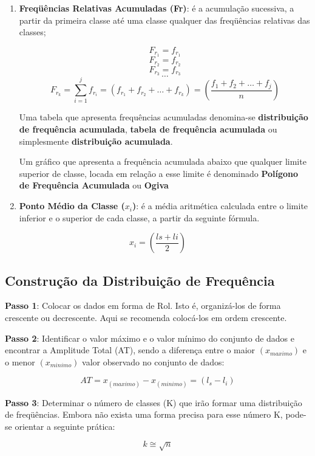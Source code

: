 \begin{enumerate}
\item \textbf{Freqüências Relativas Acumuladas (Fr)}: é a acumulação sucessiva, a partir da primeira classe até uma classe qualquer das freqüências relativas das classes;

    $$ F_{r_{1}}=f_{r_{1}} $$
    $$ F_{r_{2}}=f_{r_{2}} $$
    $$ F_{r_{3}}=f_{r_{3}} $$
    $$   \ldots  $$
    $$ F_{r_{k}}=  \sum_{i=1}^{j}f_{r_{i}}  = (f_{r_{1}}+f_{r_{2}}+\ldots+ f_{r_{k}}) = \left( \frac{f_{1}+f_{2}+\ldots+f_{j}}{n} \right) $$

Uma tabela que apresenta frequências acumuladas denomina-se \textbf{distribuição de frequência acumulada}, \textbf{tabela de frequência acumulada} ou simplesmente \textbf{distribuição acumulada}.\vskip0.3cm

Um gráfico que apresenta a frequência acumulada abaixo que qualquer limite superior de classe, locada em relação a esse limite é denominado \textbf{Polígono de Frequência Acumulada} ou \textbf{Ogiva}




    \item \textbf{Ponto Médio da Classe ($x_{i}$)}: é a média aritmética calculada entre o limite inferior e o superior de cada classe, a partir da seguinte fórmula.
\end{enumerate}


$$ x_{i} = \left( \frac{ls+li}{2} \right)$$




\newpage
\subsection{Construção da Distribuição de Frequência}

\inic \textbf{Passo 1}: Colocar os dados em forma de Rol. Isto é, organizá-los de forma crescente ou decrescente. Aqui se recomenda colocá-los em ordem crescente.\vskip0.3cm

\textbf{Passo 2}: Identificar o valor máximo e o valor mínimo do conjunto de dados e encontrar a Amplitude Total (AT), sendo a diferença entre o maior $(x_{maximo})$ e o menor $(x_{minimo})$  valor observado no conjunto de dados:

$$ AT= x_{(maximo)}- x_{(minimo)} = (l_{s} - l_{i})$$

\textbf{Passo 3}: Determinar o número de classes (K) que irão formar uma distribuição de freqüências. Embora não exista uma forma precisa para esse número K, pode-se orientar a seguinte prática:


$$ k \cong \sqrt{n}$$


